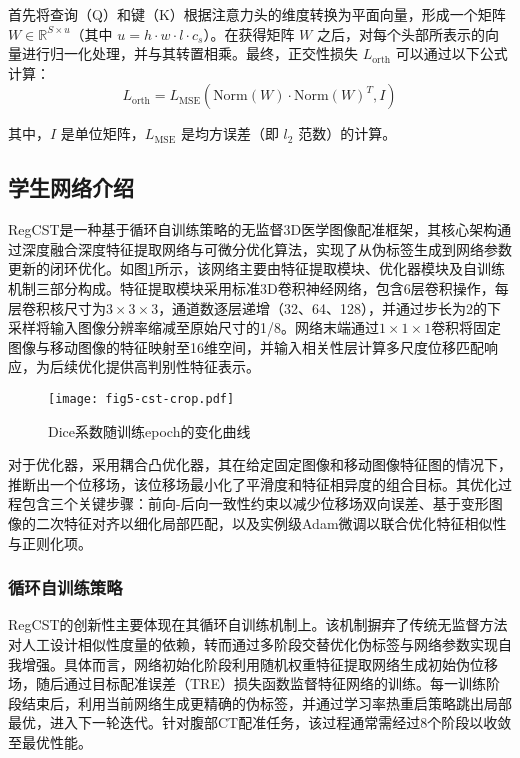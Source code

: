 首先将查询（Q）和键（K）根据注意力头的维度转换为平面向量，形成一个矩阵 \( W \in \mathbb{R}^{S \times u} \)（其中 \( u = h \cdot w \cdot l \cdot c_s \)）。在获得矩阵 \( W \) 之后，对每个头部所表示的向量进行归一化处理，并与其转置相乘。最终，正交性损失 \( L_{\text{orth}} \) 可以通过以下公式计算：
\begin{equation}
    L_{\text{orth}} = L_{\text{MSE}}\left(\text{Norm}(W) \cdot \text{Norm}(W)^T, I\right)
\end{equation}

其中，\( I \) 是单位矩阵，\( L_{\text{MSE}} \) 是均方误差（即 \( l_2 \) 范数）的计算。

\subsection{学生网络介绍}

RegCST是一种基于循环自训练策略的无监督3D医学图像配准框架，其核心架构通过深度融合深度特征提取网络与可微分优化算法，实现了从伪标签生成到网络参数更新的闭环优化。如图\ref{fig:regcst}所示，该网络主要由特征提取模块、优化器模块及自训练机制三部分构成。特征提取模块采用标准3D卷积神经网络，包含6层卷积操作，每层卷积核尺寸为$3 \times 3 \times 3$，通道数逐层递增（32、64、128），并通过步长为2的下采样将输入图像分辨率缩减至原始尺寸的1/8。网络末端通过$1 \times 1 \times 1$卷积将固定图像与移动图像的特征映射至16维空间，并输入相关性层计算多尺度位移匹配响应，为后续优化提供高判别性特征表示。

\begin{figure}[h]
    \centering
    \texttt{[image: fig5-cst-crop.pdf]}
    \caption{Dice系数随训练epoch的变化曲线}
    \label{fig:regcst}
\end{figure}

对于优化器，采用耦合凸优化器\cite{siebert2022learn}，其在给定固定图像和移动图像特征图的情况下，推断出一个位移场，该位移场最小化了平滑度和特征相异度的组合目标。其优化过程包含三个关键步骤：前向-后向一致性约束以减少位移场双向误差、基于变形图像的二次特征对齐以细化局部匹配，以及实例级Adam微调以联合优化特征相似性与正则化项。

\subsubsection{循环自训练策略}

RegCST的创新性主要体现在其循环自训练机制上。该机制摒弃了传统无监督方法对人工设计相似性度量的依赖，转而通过多阶段交替优化伪标签与网络参数实现自我增强。具体而言，网络初始化阶段利用随机权重特征提取网络生成初始伪位移场，随后通过目标配准误差（TRE）损失函数监督特征网络的训练。每一训练阶段结束后，利用当前网络生成更精确的伪标签，并通过学习率热重启策略跳出局部最优，进入下一轮迭代。针对腹部CT配准任务，该过程通常需经过8个阶段以收敛至最优性能。

